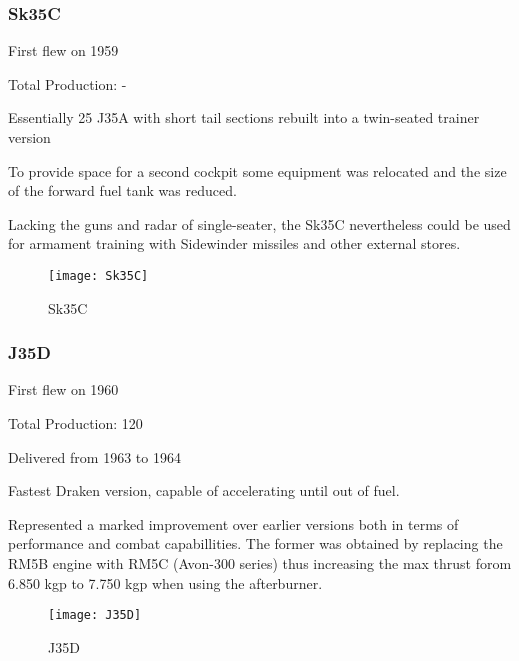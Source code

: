 \subsubsection{Sk35C}
    \begin{itemize*}
        \item First flew on 1959
        \item Total Production: -
        \item Essentially 25 J35A with short tail sections rebuilt 
            into a twin-seated trainer version
        \item To provide space for a second cockpit some equipment was relocated and the size of the forward
            fuel tank was reduced.
        \item Lacking the guns and radar of single-seater, the Sk35C nevertheless could be 
            used for armament training with Sidewinder missiles and other external stores.
    \end{itemize*}

\begin{figure}[H]
  \centering
  \hspace*{-2cm} 
  \texttt{[image: Sk35C]}
  \caption{Sk35C}
\end{figure}

\subsubsection{J35D}
    \begin{itemize*}
        \item First flew on 1960
        \item Total Production: 120
        \item Delivered from 1963 to 1964
        \item Fastest Draken version, capable of accelerating until out of fuel.
        \item Represented a marked improvement over earlier versions both in terms of performance and combat capabillities.
            The former was obtained by replacing the RM5B engine with RM5C (Avon-300 series) thus increasing the max thrust forom 6.850 kgp to 7.750 kgp
            when using the afterburner.
    \end{itemize*}

\begin{figure}[H]
  \centering
  \texttt{[image: J35D]}
  \caption{J35D}
\end{figure}

